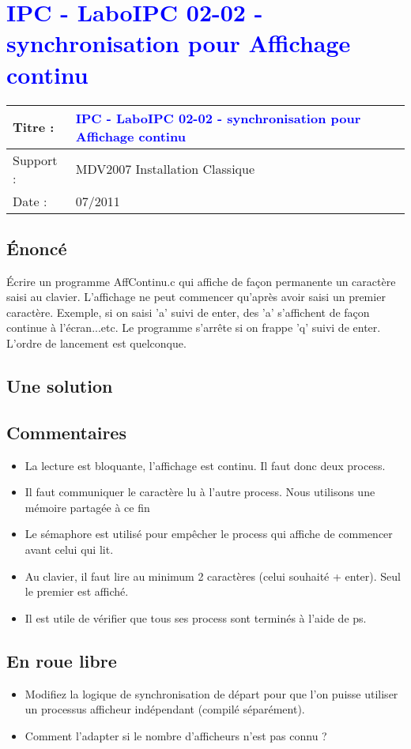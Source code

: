\lstset{language=c}
\renewcommand{\titre}{\textcolor{blue}{ IPC - LaboIPC 02-02 - synchronisation pour Affichage continu }}

\lhead{ \titre }
\section{{\titre} }

\begin{tabular}{|l|l|}
\hline
Titre : 	& \titre \\\hline
Support : 	& MDV2007 Installation Classique \\\hline
Date :		& 07/2011 \\\hline
\end{tabular}

\subsection{Énoncé}

Écrire un programme AffContinu.c qui affiche de façon permanente un caractère saisi au clavier. L'affichage ne peut commencer qu'après avoir saisi un premier caractère. Exemple, si on saisi 'a' suivi de enter, des 'a' s'affichent de façon continue à l'écran...etc. Le programme s'arrête si on frappe 'q' suivi de enter. L'ordre de lancement est quelconque.

\subsection{Une solution}



\subsection{Commentaires}

\begin{itemize}
\item La lecture est bloquante, l'affichage est continu. Il faut donc deux process.
\item Il faut communiquer le caractère lu à l'autre process. Nous utilisons une mémoire partagée à ce fin
\item Le sémaphore est utilisé pour empêcher le process qui affiche de commencer avant celui qui lit.
\item Au clavier, il faut lire au minimum 2 caractères (celui souhaité + enter). Seul le premier est affiché. 
\item Il est utile de vérifier que tous ses process sont terminés à l'aide de ps.
\end{itemize}

\subsection{En roue libre}
\begin{itemize}
\item Modifiez la logique de synchronisation de départ pour que l'on puisse utiliser un processus afficheur indépendant (compilé séparément). 
\item Comment l'adapter si le nombre d'afficheurs n'est pas connu ?
\end{itemize}
\newpage

